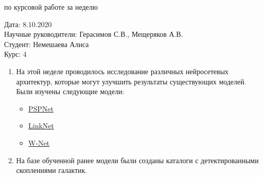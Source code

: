 \documentclass{article}
\begin{document}
\begin{center}{ по курсовой работе за неделю\\}\end{center}
Дата: 8.10.2020\\
Научные руководители: Герасимов С.В., Мещеряков А.В.\\
Студент: Немешаева Алиса\\
Курс: 4\\

\renewcommand{\labelitemi}{$\blacksquare$}
\renewcommand\labelitemii{$\square$}
\begin{enumerate}
    \item На этой неделе проводилось исследование различных нейросетевых архитектур, которые могут
        улучшить результаты существующих моделей. Были изучены следующие модели:\\
        \begin{itemize}
            \item \hyperlink{https://arxiv.org/pdf/1612.01105.pdf}{PSPNet}\\ 
            \item \hyperlink{https://arxiv.org/pdf/1707.03718.pdf}{LinkNet}\\
            \item \hyperlink{https://arxiv.org/pdf/2009.01907.pdf}{W-Net}\\
        \end{itemize}
    \item На базе обученной ранее модели были созданы каталоги с детектированными скоплениями 
        галактик.\\

\end{enumerate}
\end{document}

